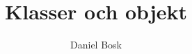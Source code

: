 \documentclass[a4paper,article,oneside]{memoir}
\begin{document}
\title{%
  Klasser och objekt
}
\author{Daniel Bosk}

\maketitle

\begin{abstract}
  
\end{abstract}



\printbibliography
\end{document}
